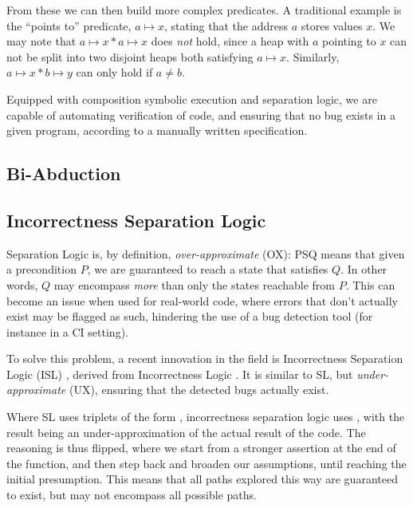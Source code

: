 From these we can then build more complex predicates. A traditional example is the ``points to'' predicate, $a \mapsto x$, stating that the address $a$ stores values $x$. We may note that $a \mapsto x * a \mapsto x$ does \emph{not} hold, since a heap with $a$ pointing to $x$ can not be split into two disjoint heaps both satisfying $a \mapsto x$. Similarly, $a\mapsto x * b \mapsto y$ can only hold if $a\neq b$.

Equipped with composition symbolic execution and separation logic, we are capable of automating verification of code, and ensuring that no bug exists in a given program, according to a manually written specification.

\subsection{Bi-Abduction}


\subsection{Incorrectness Separation Logic}

Separation Logic is, by definition, \emph{over-approximate} (OX): \SLtriple PSQ means that given a precondition $P$, we are guaranteed to reach a state that satisfies $Q$. In other words, $Q$ may encompass \emph{more} than only the states reachable from $P$. This can become an issue when used for real-world code, where errors that don't actually exist may be flagged as such, hindering the use of a bug detection tool (for instance in a CI setting).

To solve this problem, a recent innovation in the field is Incorrectness Separation Logic (ISL) \cite{isl}, derived from Incorrectness Logic \cite{incorrectnesslogic}. It is similar to SL, but \emph{under-approximate} (UX), ensuring that the detected bugs actually exist.

Where SL uses triplets of the form , incorrectness separation logic uses , with the result being an under-approximation of the actual result of the code. The reasoning is thus flipped, where we start from a stronger assertion at the end of the function, and then step back and broaden our assumptions, until reaching the initial presumption. This means that all paths explored this way are guaranteed to exist, but may not encompass all possible paths. 

